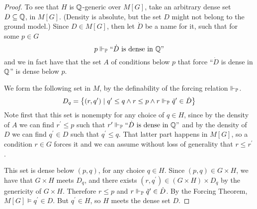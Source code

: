 \documentclass[11pt]{article}
\renewcommand{\P}{\mathbb{P}}
\begin{document}
\begin{proof}
    To see that $H$ is $\mathbb{Q}$-generic over $M[G]$,
    take an arbitrary dense set $D \subseteq \mathbb{Q}$, in $M[G]$.
    (Density is absolute, but the set $D$ might not belong to the ground
    model.)
    Since $D \in M[G]$, then let $\dot D$ be a name for it, such that for some
    $p \in G$
    \begin{equation*}
        p \forces_\P \stmt{$\dot D$ is dense in $\Q$}
    \end{equation*}
    and we in fact have that the set $A$ of conditions below $p$ that force
    ``$\dot D$ is dense in $\mathbb{Q}$'' is dense below $p$.

    We form the following set in $M$, by the definability of the forcing
    relation $\forces_\P$.
    \begin{equation*}
        D_q = \setof{
            (r, q^\prime) \sth
            q^\prime \leq q \land
            r \leq p \land
            r \forces_\P \check q^\prime \in \dot D
        }
    \end{equation*}
    Note first that this set is nonempty for any choice of $q \in H$,
    since
    by the density of $A$ we can find $r^\prime \leq p$ such that
    $r^\prime \forces_\P \stmt{$\dot D$ is dense in $\Q$}$
    and
    by the density of $D$ we can find $q^\prime \in D$ such that
    $q^\prime \leq q$.
    That latter part happens in $M[G]$, so a condition $r \in G$ forces it and
    we can assume without loss of generality that $r \leq r^\prime$.

    This set is dense below $(p, q)$, for any choice $q \in H$.
    Since $(p, q) \in G \times H$, we have that $G \times H$ meets $D_q$, and
    there exists $(r, q^\prime) \in (G \times H) \times D_q$ by the genericity
    of $G \times H$.
    Therefore $r \leq p$ and $r \forces_\P \check q^\prime \in \dot D$.
    By the Forcing Theorem, $M[G] \models q^\prime \in D$.
    But $q^\prime \in H$, so $H$ meets the dense set $D$.
\end{proof}
\end{document}
